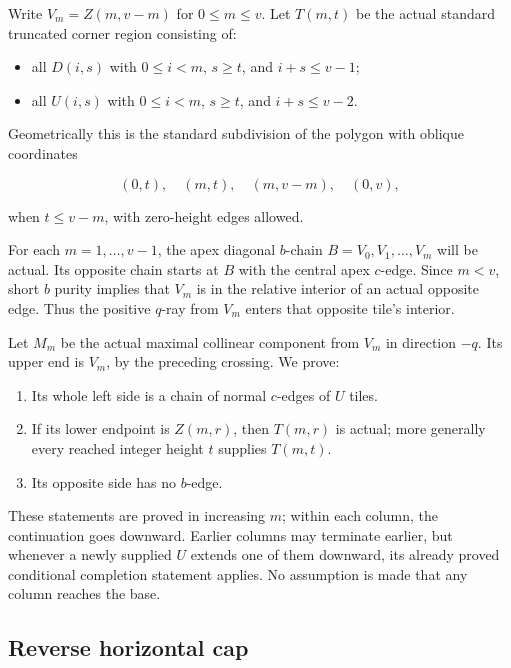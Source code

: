 \documentclass[
  11pt,
  a4paper,
]{article}
\providecommand{\tightlist}{%
  \setlength{\itemsep}{0pt}\setlength{\parskip}{0pt}}
\begin{document}
Write \(V_m=Z(m,v-m)\) for \(0\le m\le v\). Let \(T(m,t)\) be the actual
standard truncated corner region consisting of:

\begin{itemize}
\tightlist
\item
  all \(D(i,s)\) with \(0\le i<m\), \(s\ge t\), and \(i+s\le v-1\);
\item
  all \(U(i,s)\) with \(0\le i<m\), \(s\ge t\), and \(i+s\le v-2\).
\end{itemize}

Geometrically this is the standard subdivision of the polygon with
oblique coordinates

\[
(0,t),\quad(m,t),\quad(m,v-m),\quad(0,v),
\]

when \(t\le v-m\), with zero-height edges allowed.

For each \(m=1,\ldots,v-1\), the apex diagonal \(b\)-chain
\(B=V_0,V_1,\ldots,V_m\) will be actual. Its opposite chain starts at
\(B\) with the central apex \(c\)-edge. Since \(m<v\), short \(b\)
purity implies that \(V_m\) is in the relative interior of an actual
opposite edge. Thus the positive \(q\)-ray from \(V_m\) enters that
opposite tile's interior.

Let \(M_m\) be the actual maximal collinear component from \(V_m\) in
direction \(-q\). Its upper end is \(V_m\), by the preceding crossing.
We prove:

\begin{enumerate}
\def\labelenumi{\arabic{enumi}.}
\tightlist
\item
  Its whole left side is a chain of normal \(c\)-edges of \(U\) tiles.
\item
  If its lower endpoint is \(Z(m,r)\), then \(T(m,r)\) is actual; more
  generally every reached integer height \(t\) supplies \(T(m,t)\).
\item
  Its opposite side has no \(b\)-edge.
\end{enumerate}

These statements are proved in increasing \(m\); within each column, the
continuation goes downward. Earlier columns may terminate earlier, but
whenever a newly supplied \(U\) extends one of them downward, its
already proved conditional completion statement applies. No assumption
is made that any column reaches the base.

\hypertarget{reverse-horizontal-cap}{%
\subsection{Reverse horizontal cap}\label{reverse-horizontal-cap}}
\end{document}
